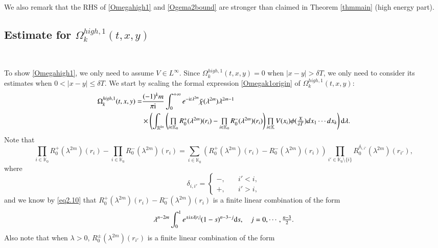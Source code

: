 \documentclass[11pt,reqno]{amsart}
\def\d{{\rm d}}
\def\i{{\rm i}}
\numberwithin{equation}{section}
\theoremstyle{definition}
\begin{document}
We also remark that the RHS of \eqref{Omegahigh1} and \eqref{Ogema2bound} are stronger than claimed in Theorem \ref{thmmain} (high energy part).


\subsection{Estimate for $\Omega_k^{high,1}(t,x,y)$}\label{section4.2}\

To show \eqref{Omegahigh1}, we only need to assume $V\in L^\infty$. Since $\Omega_k^{high,1}(t,x,y)=0$ when $|x-y|>\delta T$, we only need to consider its estimates when $0<|x-y|\leq\delta T$. We start by scaling the formal expression \eqref{Omegak1origin} of $\Omega_k^{high,1}(t,x,y)$:
\begin{equation*}
	\begin{split}
		\Omega_k^{high,1}(t,x,y)=&\frac{(-1)^km}{\pi\i}\int_0^{+\infty}e^{-\mathrm{i}t\lambda^{2m}}\tilde{\chi}(\lambda^{2m})\lambda^{2m-1}\\
		&\times\left(\int_{\mathbb{R}^{kn}}\left(\mbox{$\prod\limits_{i\in\mathbb{K}_0}R_0^+(\lambda^{2m})(r_i)-\prod\limits_{i\in\mathbb{K}_0}R_0^-(\lambda^{2m})(r_i)$}\right)\mbox{$\prod\limits_{i\in\mathbb{K}}V(x_i)$}\phi(\mbox{$\frac{X}{\delta T}$})dx_1\cdots dx_k\right)\d\lambda.
	\end{split}
\end{equation*}
Note that
\begin{equation*}
	\prod\limits_{i\in\mathbb{K}_0}R_0^+(\lambda^{2m})(r_i)-\prod\limits_{i\in\mathbb{K}_0}R_0^-(\lambda^{2m})(r_i)=\sum\limits_{i\in\mathbb{K}_0}\left(R_0^+(\lambda^{2m})(r_i)-R_0^-(\lambda^{2m})(r_i)\right)\prod\limits_{i'\in\mathbb{K}_0\setminus\{i\}}R_0^{\delta_{i,i'}}(\lambda^{2m})(r_{i'}),
\end{equation*}
where
\begin{equation*}
	\delta_{i,i'}=\begin{cases}
		-,\quad&i'<i,\\
		+,&i'>i,
	\end{cases}
\end{equation*}
and we know by \eqref{eq2.10} that $R_0^+(\lambda^{2m})(r_i)-R_0^-(\lambda^{2m})(r_i)$ is a finite linear combination of the form
\begin{equation*}
	\lambda^{n-2m}\int_0^1e^{\pm\i s\lambda|r_i|}(1-s)^{n-3-j}\d s,\quad\mbox{$j=0,\cdots,\frac{n-3}{2}$}.
\end{equation*}
Also note that when $\lambda>0$, $R_0^{\pm}(\lambda^{2m})(r_{i'})$ is a finite linear combination of the form
\end{document}
